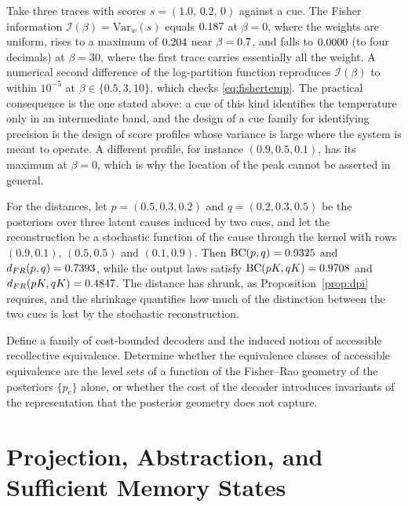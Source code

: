 \begin{workedex}\label{ex:fisher35}
Take three traces with scores $s=(1.0,\,0.2,\,0)$ against a cue. The Fisher information $\mathcal I(\beta)=\mathrm{Var}_w(s)$ equals $0.187$ at $\beta=0$, where the weights are uniform, rises to a maximum of $0.204$ near $\beta=0.7$, and falls to $0.0000$ (to four decimals) at $\beta=30$, where the first trace carries essentially all the weight. A numerical second difference of the log-partition function reproduces $\mathcal I(\beta)$ to within $10^{-5}$ at $\beta\in\{0.5,3,10\}$, which checks \eqref{eq:fishertemp}. The practical consequence is the one stated above: a cue of this kind identifies the temperature only in an intermediate band, and the design of a cue family for identifying precision is the design of score profiles whose variance is large where the system is meant to operate. A different profile, for instance $(0.9,0.5,0.1)$, has its maximum at $\beta=0$, which is why the location of the peak cannot be asserted in general.

For the distances, let $p=(0.5,0.3,0.2)$ and $q=(0.2,0.3,0.5)$ be the posteriors over three latent causes induced by two cues, and let the reconstruction be a stochastic function of the cause through the kernel with rows $(0.9,0.1)$, $(0.5,0.5)$ and $(0.1,0.9)$. Then $\mathrm{BC}(p,q)=0.9325$ and $d_{FR}(p,q)=0.7393$, while the output laws satisfy $\mathrm{BC}(pK,qK)=0.9708$ and $d_{FR}(pK,qK)=0.4847$. The distance has shrunk, as Proposition~\ref{prop:dpi} requires, and the shrinkage quantifies how much of the distinction between the two cues is lost by the stochastic reconstruction.
\end{workedex}

\begin{problem}\label{prob:geometry}
Define a family of cost-bounded decoders and the induced notion of accessible recollective equivalence. Determine whether the equivalence classes of accessible equivalence are the level sets of a function of the Fisher--Rao geometry of the posteriors $\{p_c\}$ alone, or whether the cost of the decoder introduces invariants of the representation that the posterior geometry does not capture.
\end{problem}

\chapter{Projection, Abstraction, and Sufficient Memory States}\label{ch:projection}

